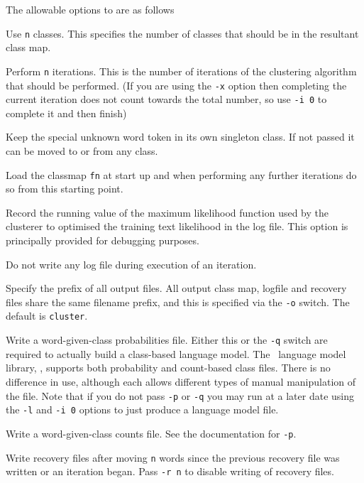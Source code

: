 The allowable options to  are as follows
\begin{optlist}

   Use {\tt n} classes. This specifies the number of
        classes that should be in the resultant class map.

   Perform {\tt n} iterations. This is the number of
        iterations of the clustering algorithm that should be
        performed. (If you are using the {\tt -x} option then
        completing the current iteration does not count towards
        the total number, so use {\tt -i 0} to complete it and
        then finish)

   Keep the special unknown word token in its own
        singleton class.  If not passed it can be moved to or from
        any class.

   Load the classmap {\tt fn} at start up and when
        performing any further iterations do so from this starting
        point.

   Record the running value of the maximum likelihood
        function used by the clusterer to optimised the training
        text likelihood in the log file.  This option is principally
        provided for debugging purposes.

   Do not write any log file during execution of an
        iteration.

   Specify the prefix of all output files.  All output
        class map, logfile and recovery files share the same filename
        prefix, and this is specified via the {\tt -o} switch.  The
        default is {\tt cluster}.

   Write a word-given-class probabilities file. Either
        this or the {\tt -q} switch are required to actually build a
        class-based language model. The \HTK\ language model library,
        , supports both probability and count-based
        class files.  There is no difference in use, although each
        allows different types of manual manipulation of the file.
        Note that if you do not pass {\tt -p} or {\tt -q} you may
        run  at a later date using the {\tt -l} and
        {\tt -i 0} options to just produce a language model file.

   Write a word-given-class counts file. See the
        documentation for {\tt -p}.

   Write recovery files after moving {\tt n} words
        since the previous recovery file was written or an iteration
        began.  Pass {\tt -r n} to disable writing of recovery files.


\end{optlist}
